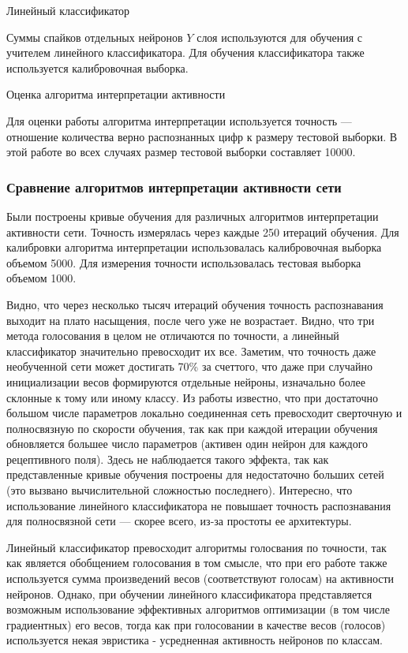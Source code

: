 \documentclass[a4paper]{article}
\begin{document}
\begin{center}
 Линейный классификатор
\end{center}
Суммы спайков отдельных нейронов $Y$ слоя используются для обучения с учителем линейного классификатора. Для обучения классификатора также используется калибровочная выборка.

\begin{center}
 Оценка алгоритма интерпретации активности
\end{center}
Для оценки работы алгоритма интерпретации используется точность --- отношение количества верно распознанных цифр к размеру тестовой выборки. В этой работе во всех случаях размер тестовой выборки составляет 10000. 

\subsubsection{Сравнение алгоритмов интерпретации активности сети}
Были построены кривые обучения для различных алгоритмов интерпретации активности сети. Точность измерялась через каждые 250 итераций обучения. Для калибровки алгоритма интерпретации использовалась калибровочная выборка объемом 5000. Для измерения точности использовалась тестовая выборка объемом 1000.

Видно, что через несколько тысяч итераций обучения точность распознавания выходит на плато насыщения, после чего уже не возрастает. Видно, что три метода голосования в целом не отличаются по точности, а линейный классификатор значительно превосходит их все. Заметим, что точность даже необученной сети может достигать 70\% за счеттого, что даже при случайно инициализации весов формируются отдельные нейроны, изначально более склонные к тому или иному классу. Из работы \cite{saunders2019locally} известно, что при достаточно большом числе параметров локально соединенная сеть превосходит сверточную и полносвязную по скорости обучения, так как при каждой итерации обучения обновляется большее число параметров (активен один нейрон для каждого рецептивного поля). Здесь не наблюдается такого эффекта, так как представленные кривые обучения построены для недостаточно больших сетей (это вызвано вычислительной сложностью последнего). Интересно, что использование линейного классификатора не повышает точность распознавания для полносвязной сети --- скорее всего, из-за простоты ее архитектуры.

Линейный классификатор превосходит алгоритмы голосвания по точности, так как является обобщением голосования в том смысле, что при его работе также используется сумма произведений весов (соответствуют голосам) на активности нейронов. Однако, при обучении линейного классификатора представляется возможным использование эффективных алгоритмов оптимизации (в том числе градиентных) его весов, тогда как при голосовании в качестве весов (голосов) используется некая эвристика - усредненная активность нейронов по классам.
\end{document}
